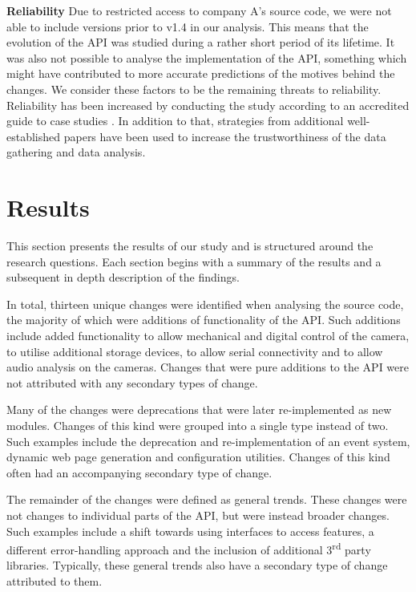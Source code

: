 \documentclass{sig-alternate}
\begin{document}
\smallskip \noindent
\textbf{Reliability  } Due to restricted access to company A's source code, we were not able to include versions prior to v1.4 in our analysis. This means that the evolution of the API was studied during a rather short period of its lifetime. It was also not possible to analyse the implementation of the API, something which might have contributed to more accurate predictions of the motives behind the changes. We consider these factors to be the remaining threats to reliability. Reliability has been increased by conducting the study according to an accredited guide to case studies \cite{runeson2009guidelines}. In addition to that, strategies from additional well-established papers \cite{andersson2007spiral, robson2002real, seaman1999qualitative} have been used to increase the trustworthiness of the data gathering and data analysis. 


 
\section{Results} \label{results} 

This section presents the results of our study and is structured around the research questions. Each section begins with a summary of the results and a subsequent in depth description of the findings.

In total, thirteen unique changes were identified when analysing the source code, the majority of which were additions of functionality of the API. Such additions include added functionality to allow mechanical and digital control of the camera, to utilise additional storage devices, to allow serial connectivity and to allow audio analysis on the cameras. Changes that were pure additions to the API were not attributed with any secondary types of change.

Many of the changes were deprecations that were later re-implemented as new modules. Changes of this kind were grouped into a single type instead of two. Such examples include the deprecation and re-implementation of an event system, dynamic web page generation and configuration utilities. Changes of this kind often had an accompanying secondary type of change.

The remainder of the changes were defined as general trends. These changes were not changes to individual parts of the API, but were instead broader changes. Such examples include a shift towards using interfaces to access features, a different error-handling approach and the inclusion of additional 3\textsuperscript{rd} party libraries. Typically, these general trends also have a secondary type of change attributed to them.
\end{document}
